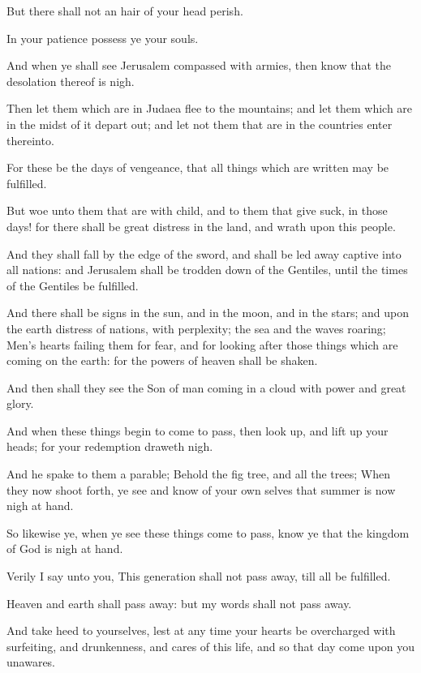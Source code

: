 \verse But there shall not an hair of your head perish.

\verse In your patience possess ye your souls.

\verse And when ye shall see Jerusalem compassed with armies, then know that the desolation thereof is nigh.

\verse Then let them which are in Judaea flee to the mountains; and let them which are in the midst of it depart out; and let not them that are in the countries enter thereinto.

\verse For these be the days of vengeance, that all things which are written may be fulfilled.

\verse But woe unto them that are with child, and to them that give suck, in those days! for there shall be great distress in the land, and wrath upon this people.

\verse And they shall fall by the edge of the sword, and shall be led away captive into all nations: and Jerusalem shall be trodden down of the Gentiles, until the times of the Gentiles be fulfilled.

\verse And there shall be signs in the sun, and in the moon, and in the stars; and upon the earth distress of nations, with perplexity; the sea and the waves roaring; \verse Men's hearts failing them for fear, and for looking after those things which are coming on the earth: for the powers of heaven shall be shaken.

\verse And then shall they see the Son of man coming in a cloud with power and great glory.

\verse And when these things begin to come to pass, then look up, and lift up your heads; for your redemption draweth nigh.

\verse And he spake to them a parable; Behold the fig tree, and all the trees; \verse When they now shoot forth, ye see and know of your own selves that summer is now nigh at hand.

\verse So likewise ye, when ye see these things come to pass, know ye that the kingdom of God is nigh at hand.

\verse Verily I say unto you, This generation shall not pass away, till all be fulfilled.

\verse Heaven and earth shall pass away: but my words shall not pass away.

\verse And take heed to yourselves, lest at any time your hearts be overcharged with surfeiting, and drunkenness, and cares of this life, and so that day come upon you unawares.

